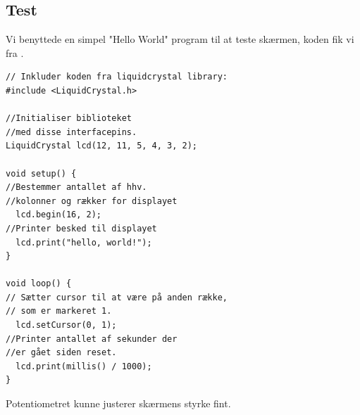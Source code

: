  
\subsection{Test}
Vi benyttede en simpel "Hello World" program til at teste skærmen, koden fik vi fra \cite{arduinoLCD}.





\begin{lstlisting}[caption=kodeeksempel "Hello World" med timer, label={alg:helloworld}]
// Inkluder koden fra liquidcrystal library:
#include <LiquidCrystal.h>

//Initialiser biblioteket 
//med disse interfacepins.
LiquidCrystal lcd(12, 11, 5, 4, 3, 2);

void setup() {
//Bestemmer antallet af hhv.
//kolonner og rækker for displayet
  lcd.begin(16, 2);
//Printer besked til displayet
  lcd.print("hello, world!");
}

void loop() {
// Sætter cursor til at være på anden række,
// som er markeret 1.
  lcd.setCursor(0, 1);
//Printer antallet af sekunder der 
//er gået siden reset.
  lcd.print(millis() / 1000);
}
\end{lstlisting}


Potentiometret kunne justerer skærmens styrke fint.
